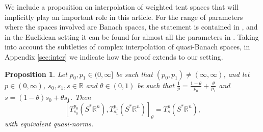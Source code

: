 \documentclass{amsart}
\newcommand {\ud}{\mathrm{d}}
\newcommand {\R}{\mathbb R}
\newcommand {\Rn}{\mathbb{R}^{n}}
\newcommand {\Sp}{S^{*}\Rn}
\newcommand {\Spp}{S^{*}_{+}\Rn}
\newcommand {\w}{\omega}
\newtheorem{lemma}[theorem]{Lemma}
\newtheorem{proposition}[theorem]{Proposition}
\theoremstyle{definition}
\numberwithin{equation}{section}
\begin{document}





We include a proposition on interpolation of weighted tent spaces that will implicitly play an important role in this article. For the range of parameters where the spaces involved are Banach spaces, the statement is contained in \cite{Amenta18}, and in the Euclidean setting it can be found for almost all the parameters in \cite{HoMaMc11}. Taking into account the subtleties of complex interpolation of quasi-Banach spaces, in Appendix \ref{sec:inter} we indicate how the proof extends to our setting.


\begin{proposition}\label{prop:tentint}
Let $p_{0},p_{1}\in(0,\infty]$ be such that $(p_{0},p_{1})\neq (\infty,\infty)$, and let $p\in(0,\infty)$, $s_{0},s_{1},s\in\R$ and $\theta\in(0,1)$ be such that $\frac{1}{p}=\frac{1-\theta}{p_{0}}+\frac{\theta}{p_{1}}$ and $s=(1-\theta)s_{0}+\theta s_{1}$. Then
\[
[T^{p_{0}}_{s_{0}}(\Sp),T^{p_{1}}_{s_{1}}(\Sp)]_{\theta}=T^{p}_{s}(\Sp),
\]
with equivalent quasi-norms.
\end{proposition}
\end{document}
